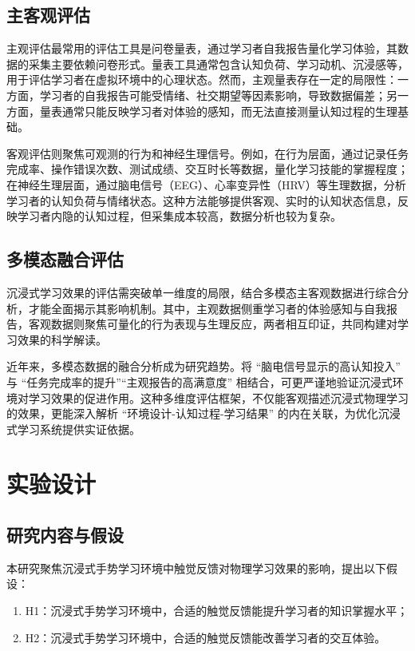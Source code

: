 \documentclass[runningheads]{llncs}
\begin{document}
\subsection{主客观评估}
主观评估最常用的评估工具是问卷量表，通过学习者自我报告量化学习体验，其数据的采集主要依赖问卷形式。量表工具通常包含认知负荷\cite{sweller1988cognitive}、学习动机\cite{keller1987development}、沉浸感\cite{sherman2003understanding}等，用于评估学习者在虚拟环境中的心理状态。然而，主观量表存在一定的局限性：一方面，学习者的自我报告可能受情绪、社交期望等因素影响，导致数据偏差；另一方面，量表通常只能反映学习者对体验的感知，而无法直接测量认知过程的生理基础。

客观评估则聚焦可观测的行为\cite{Mayer01012003}和神经生理信号。例如，在行为层面，通过记录任务完成率、操作错误次数、测试成绩、交互时长等数据，量化学习技能的掌握程度；在神经生理层面，通过脑电信号（EEG）、心率变异性（HRV）等生理数据，分析学习者的认知负荷与情绪状态。这种方法能够提供客观、实时的认知状态信息，反映学习者内隐的认知过程，但采集成本较高，数据分析也较为复杂。


\subsection{多模态融合评估}
沉浸式学习效果的评估需突破单一维度的局限，结合多模态主客观数据进行综合分析，才能全面揭示其影响机制。其中，主观数据侧重学习者的体验感知与自我报告，客观数据则聚焦可量化的行为表现与生理反应，两者相互印证，共同构建对学习效果的科学解读。

近年来，多模态数据的融合分析成为研究趋势。将 “脑电信号显示的高认知投入” 与 “任务完成率的提升”“主观报告的高满意度” 相结合，可更严谨地验证沉浸式环境对学习效果的促进作用\cite{DUBOVI2022104495}。这种多维度评估框架，不仅能客观描述沉浸式物理学习的效果，更能深入解析 “环境设计-认知过程-学习结果” 的内在关联，为优化沉浸式学习系统提供实证依据。

\section{实验设计}
\subsection{研究内容与假设}
本研究聚焦沉浸式手势学习环境中触觉反馈对物理学习效果的影响，提出以下假设：

\begin{enumerate}[label={$\bullet$}]
  \item H1：沉浸式手势学习环境中，合适的触觉反馈能提升学习者的知识掌握水平；
  \item H2：沉浸式手势学习环境中，合适的触觉反馈能改善学习者的交互体验。
\end{enumerate}
\end{document}
